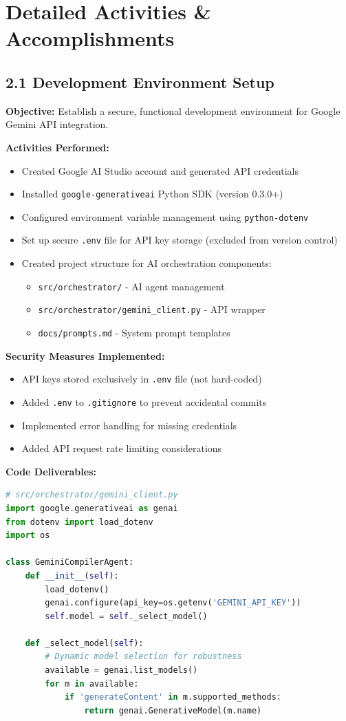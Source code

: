 \documentclass[a4paper,11pt]{article}
\begin{document}
\section{Detailed Activities \& Accomplishments}

\subsection{2.1 Development Environment Setup}

\textbf{Objective:} Establish a secure, functional development environment for Google Gemini API integration.

\textbf{Activities Performed:}
\begin{itemize}[leftmargin=*]
    \item Created Google AI Studio account and generated API credentials
    \item Installed \texttt{google-generativeai} Python SDK (version 0.3.0+)
    \item Configured environment variable management using \texttt{python-dotenv}
    \item Set up secure \texttt{.env} file for API key storage (excluded from version control)
    \item Created project structure for AI orchestration components:
    \begin{itemize}
        \item \texttt{src/orchestrator/} - AI agent management
        \item \texttt{src/orchestrator/gemini\_client.py} - API wrapper
        \item \texttt{docs/prompts.md} - System prompt templates
    \end{itemize}
\end{itemize}

\textbf{Security Measures Implemented:}
\begin{itemize}[leftmargin=*]
    \item API keys stored exclusively in \texttt{.env} file (not hard-coded)
    \item Added \texttt{.env} to \texttt{.gitignore} to prevent accidental commits
    \item Implemented error handling for missing credentials
    \item Added API request rate limiting considerations
\end{itemize}

\textbf{Code Deliverables:}
\begin{lstlisting}[language=Python, caption=Gemini Client Core Implementation]
# src/orchestrator/gemini_client.py
import google.generativeai as genai
from dotenv import load_dotenv
import os

class GeminiCompilerAgent:
    def __init__(self):
        load_dotenv()
        genai.configure(api_key=os.getenv('GEMINI_API_KEY'))
        self.model = self._select_model()
    
    def _select_model(self):
        # Dynamic model selection for robustness
        available = genai.list_models()
        for m in available:
            if 'generateContent' in m.supported_methods:
                return genai.GenerativeModel(m.name)
\end{lstlisting}
\end{document}
